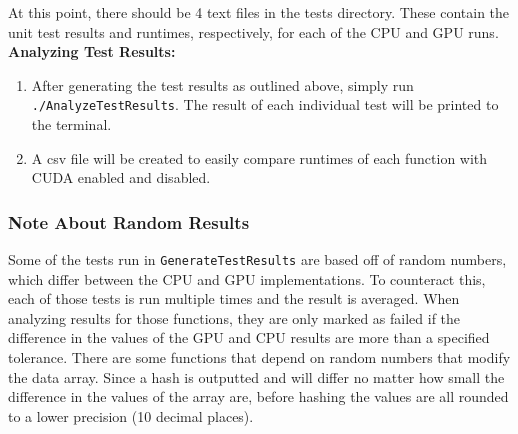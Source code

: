 \documentclass[12pt]{article}
\begin{document}
At this point, there should be 4 text files in the tests directory. These contain the unit test results and runtimes, respectively, for each of the CPU and GPU runs.\\

\textbf{Analyzing Test Results:}
\begin{enumerate}
\item After generating the test results as outlined above, simply run \texttt{./AnalyzeTestResults}. The result of each individual test will be printed to the terminal.
\item A csv file will be created to easily compare runtimes of each function with CUDA enabled and disabled.
\end{enumerate}


\subsubsection{Note About Random Results}
Some of the tests run in \texttt{GenerateTestResults} are based off of random numbers, which differ between the CPU and GPU implementations. To counteract this, each of those tests is run multiple times and the result is averaged. When analyzing results for those functions, they are only marked as failed if the difference in the values of the GPU and CPU results are more than a specified tolerance. There are some functions that depend on random numbers that modify the data array. Since a hash is outputted and will differ no matter how small the difference in the values of the array are, before hashing the values are all rounded to a lower precision (10 decimal places).
\end{document}
